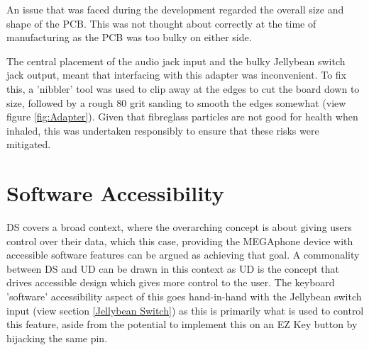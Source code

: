 An issue that was faced during the development regarded the overall size and shape of the PCB.
This was not thought about correctly at the time of manufacturing as the PCB was too bulky on either side.

The central placement of the audio jack input and the bulky Jellybean switch jack output, meant that interfacing with this adapter was inconvenient.
To fix this, a 'nibbler' tool was used to clip away at the edges to cut the board down to size, followed by a rough 80 grit sanding to smooth the edges somewhat (view figure \ref{fig:Adapter}).
Given that fibreglass particles are not good for health when inhaled, this was undertaken responsibly to ensure that these risks were mitigated.


\section{Software Accessibility} \label{Software Access}
DS covers a broad context, where the overarching concept is about giving users control over their data, which this case, providing the MEGAphone device with accessible software features can be argued as achieving that goal.
A commonality between DS and UD can be drawn in this context as UD is the concept that drives accessible design which gives more control to the user.
The keyboard 'software' accessibility aspect of this goes hand-in-hand with the Jellybean switch input (view section \ref{Jellybean Switch}) as this is primarily what is used to control this feature, aside from the potential to implement this on an EZ Key button by hijacking the same pin.

